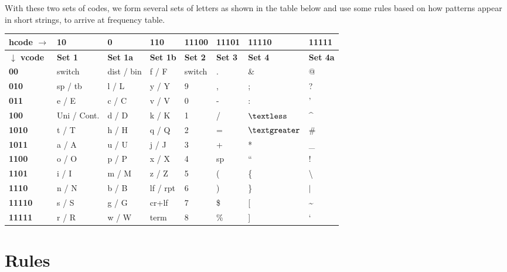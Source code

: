 \documentclass[]{article}
\begin{document}
With these two sets of codes, we form several sets of letters as shown in the table below and use some rules based on how patterns appear in short strings, to arrive at frequency table.

\begin{center}
	\begin{tabular}{ | l | l | l | l | l | l | l | l | } \hline
		\textbf{hcode $\rightarrow$} & \textbf{10} & \textbf{0} & \textbf{110} & \textbf{11100} & \textbf{11101} & \textbf{11110} & \textbf{11111} \\ \hline
		\textbf{$\downarrow$ vcode} & \textbf{Set 1} & \textbf{Set 1a} & \textbf{Set 1b} & \textbf{Set 2} & \textbf{Set 3} & \textbf{Set 4} & \textbf{Set 4a} \\ \hline
		\textbf{00} & switch & dist / bin & f / F & switch & . & \& & @ \\ \hline
		\textbf{010} & sp / tb & l / L & y / Y & 9 & , & ; & ? \\ \hline
		\textbf{011} & e / E & c / C & v / V & 0 & - & : & ' \\ \hline
		\textbf{100} & Uni / Cont. & d / D & k / K & 1 & / & $\textless$ & \^{} \\ \hline
		\textbf{1010} & t / T & h / H & q / Q & 2 & = & $\textgreater$ & \# \\ \hline
		\textbf{1011} & a / A & u / U & j / J & 3 & + & * & \_ \\ \hline
		\textbf{1100} & o / O & p / P & x / X & 4 & sp & \textquotedblleft & ! \\ \hline
		\textbf{1101} & i / I & m / M & z / Z & 5 & ( & \{ & \textbackslash \\ \hline
		\textbf{1110} & n / N & b / B & lf / rpt & 6 & ) & \} & $|$ \\ \hline
		\textbf{11110} & s / S & g / G & cr+lf & 7 & \$ & [ & \~{} \\ \hline
		\textbf{11111} & r / R & w / W & term & 8 & \% & ] & ` \\ \hline
	\end{tabular}
\end{center}

\section{Rules}
\end{document}
